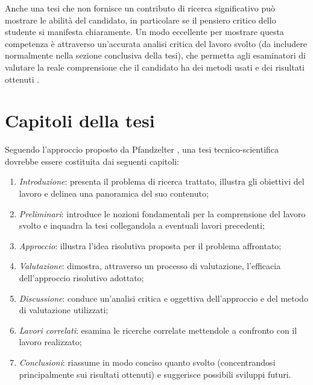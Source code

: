 Anche una tesi che non fornisce un contributo di ricerca significativo può mostrare le abilità del candidato, in particolare se il pensiero critico dello studente si manifesta chiaramente. Un modo eccellente per mostrare questa competenza è attraverso un'accurata analisi critica del lavoro svolto (da includere normalmente nella sezione conclusiva della tesi), che permetta agli esaminatori di valutare la reale comprensione che il candidato ha dei metodi usati e dei risultati ottenuti \cite{zobel2015writing}.

\section{Capitoli della tesi}

Seguendo l'approccio proposto da Pfandzelter \etAl \cite{pfandzelter2022thesis}, una tesi tecnico{\hyp}scientifica dovrebbe essere costituita dai seguenti capitoli:

\begin{enumerate}

\item \textit{Introduzione}: presenta il problema di ricerca trattato, illustra gli obiettivi del lavoro e delinea una panoramica del suo contenuto;

\item \textit{Preliminari}: introduce le nozioni fondamentali per la comprensione del lavoro svolto e inquadra la tesi collegandola a eventuali lavori precedenti;

\item \textit{Approccio}: illustra l'idea risolutiva proposta per il problema affrontato;

\item \textit{Valutazione}: dimostra, attraverso un processo di valutazione, l'efficacia dell'approccio risolutivo adottato;

\item \textit{Discussione}: conduce un'analisi critica e oggettiva dell'approccio e del metodo di valutazione utilizzati;

\item \textit{Lavori correlati}: esamina le ricerche correlate mettendole a confronto con il lavoro realizzato;

\item \textit{Conclusioni}: riassume in modo conciso quanto svolto (concentrandosi principalmente sui risultati ottenuti) e suggerisce possibili sviluppi futuri.

\end{enumerate}

